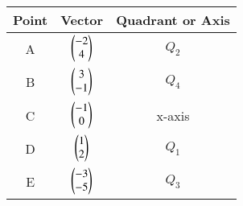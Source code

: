 \begin{tabular}[12pt]{ |c| c| c|} 
    \hline
    {Point} & {Vector} & {Quadrant or Axis}\\ 
    \hline
    A & $ \begin{pmatrix}-2 \\ 4\end{pmatrix} $ & $ Q_2 $ \\
    \hline 
    B & $ \begin{pmatrix}3 \\ -1\end{pmatrix} $ & $ Q_4 $ \\
    \hline
    C & $ \begin{pmatrix}-1 \\ 0\end{pmatrix} $ & x-axis \\
    \hline   
    D & $ \begin{pmatrix}1 \\ 2\end{pmatrix} $ & $ Q_1 $ \\
    \hline
    E & $ \begin{pmatrix}-3 \\ -5\end{pmatrix} $ & $ Q_3 $ \\
    \hline
    \end{tabular}
